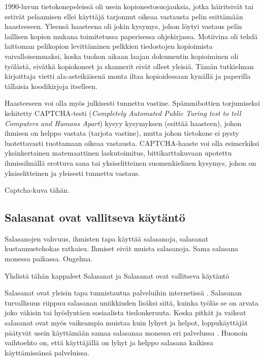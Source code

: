 \documentclass[english,gradu]{tktltiki}
\begin{document}
  1990-luvun tietokonepeleissä oli usein kopionestosuojauksia, jotka häiritsivät tai estivät pelaamisen ellei käyttäjä tarjonnut oikeaa vastausta pelin esittämään haasteeseen. Yleensä haasteena oli jokin kysymys, johon löytyi vastaus pelin laillisen kopion mukana toimitetussa paperisessa ohjekirjassa. Motiivina oli tehdä laittoman pelikopion levittäminen pelkkien tiedostojen kopioimista vaivalloisemmaksi, koska tuohon aikaan laajan dokumentin kopioiminen oli työlästä, eivätkä kopiokoneet ja skannerit eivät olleet yleisiä. Tämän tutkielman kirjoittaja vietti ala-asteikäisenä monta iltaa kopioidessaan kynällä ja paperilla tällaisia koodikirjoja itselleen.

  Haasteeseen voi olla myös julkisesti tunnettu vastine. Spämmibottien torjumiseksi kehitetty CAPTCHA-testi (\emph{Completely Automated Public Turing test to tell Computers and Humans Apart}) kysyy kysymyksen (esittää haasteen), johon ihmisen on helppo vastata (tarjota vastine), mutta johon tietokone ei pysty luotettavasti tuottamaan oikeaa vastausta. CAPTCHA-haaste voi olla esimerkiksi yksinkertainen matemaattinen laskutoimitus, bittikarttakuvaan upotettu ihmissilmällä erottuva sana tai yksiselitteinen suomenkielinen kysymys, johon on yksiselitteinen ja yleisesti tunnettu vastaus.

  Captcha-kuva tähän.


  \subsection{Salasanat ovat vallitseva käytäntö} %
  \label{sub:salasanat}
  Salasanojen vahvuus, ihmisten tapa käyttää salasanoja, salasanat kustannustehokas ratkaisu.
  Ihmiset eivät muista salasanoja. Sama salasana monessa paikassa. Ongelma.

  Yhdistä tähän kappaleet Salasanat ja Salasanat ovat vallitseva käytäntö

  Salasanat ovat yleisin tapa tunnistautua palveluihin internetissä \cite{study_of_passwords_07, passpet_06, password_management_strategies_06, pwdhash_extension_05}.
  Salasanan turvallisuus riippuu salasanan uniikkiuden lisäksi siitä, kuinka työläs se on arvata joko väkisin tai hyödyntäen sosiaalista tiedonkeruuta. Koska pitkät ja vaikeat salasanat ovat myös vaikeampia muistaa kuin lyhyet ja helpot, loppukäyttäjät päätyvät usein käyttämään samaa salasanaa monessa eri palvelussa \cite{study_of_passwords_07}. Huonoin vaihtoehto on, että käyttäjällä on lyhyt ja helppo salasana kaikissa käyttämissänsä palveluissa.
\end{document}
